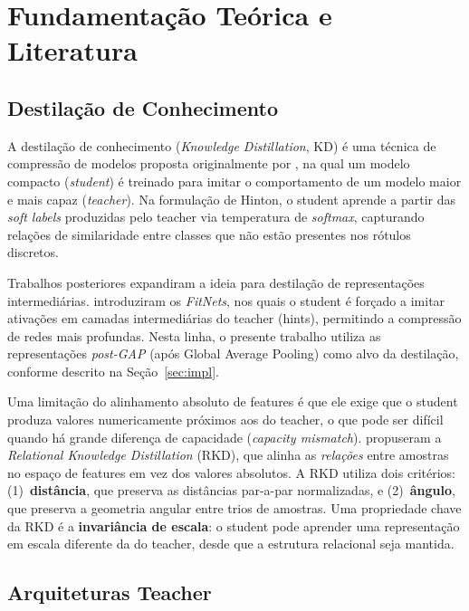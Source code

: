 \documentclass[
  article,            %
  11pt,               %
  letterpaper,        %
  oneside,            %
  sumario = tradicional
]{abntex2}
\begin{document}
\textual


\section{Fundamentação Teórica e Literatura}

\subsection{Destilação de Conhecimento}

A destilação de conhecimento (\textit{Knowledge Distillation}, KD) é uma técnica
de compressão de modelos proposta originalmente por \textcite{hinton2015distilling},
na qual um modelo compacto (\textit{student}) é treinado para imitar o comportamento
de um modelo maior e mais capaz (\textit{teacher}). Na formulação de Hinton, o
student aprende a partir das \textit{soft labels} produzidas pelo teacher via
temperatura de \textit{softmax}, capturando relações de similaridade entre classes
que não estão presentes nos rótulos discretos.

Trabalhos posteriores expandiram a ideia para destilação de representações
intermediárias. \textcite{romero2015fitnets} introduziram os \textit{FitNets}, nos
quais o student é forçado a imitar ativações em camadas intermediárias do teacher
(hints), permitindo a compressão de redes mais profundas. Nesta linha, o presente
trabalho utiliza as representações \textit{post-GAP} (após Global Average Pooling)
como alvo da destilação, conforme descrito na Seção~\ref{sec:impl}.

Uma limitação do alinhamento absoluto de features é que ele exige que o student
produza valores numericamente próximos aos do teacher, o que pode ser difícil
quando há grande diferença de capacidade (\textit{capacity mismatch}).
\textcite{park2019rkd} propuseram a \textit{Relational Knowledge Distillation}
(RKD), que alinha as \textit{relações} entre amostras no espaço de features
em vez dos valores absolutos. A RKD utiliza dois critérios: (1)~\textbf{distância},
que preserva as distâncias par-a-par normalizadas, e (2)~\textbf{ângulo}, que
preserva a geometria angular entre trios de amostras. Uma propriedade chave
da RKD é a \textbf{invariância de escala}: o student pode aprender uma representação
em escala diferente da do teacher, desde que a estrutura relacional seja mantida.

\subsection{Arquiteturas Teacher}
\end{document}
